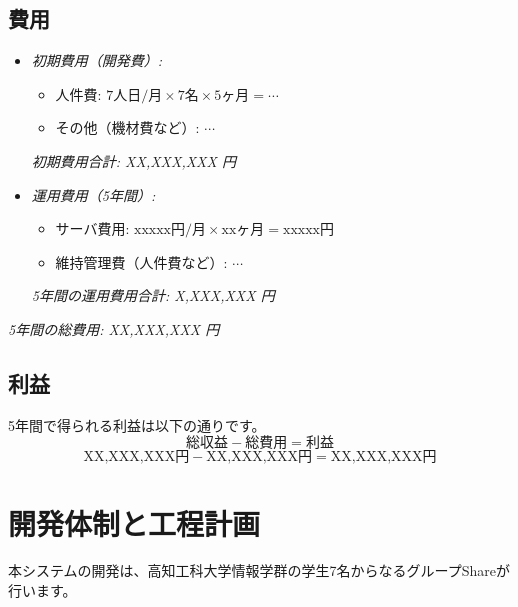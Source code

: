 \documentclass{docs}
\begin{document}
\subsection{費用}
\begin{itemize}
	\item \emph{初期費用（開発費）:}
		\begin{itemize}
			\item 人件費: $\text{7人日/月}\times\text{7名}\times\text{5ヶ月}
			=\cdots$
			\item その他（機材費など）: $\cdots$
		\end{itemize}
		\emph{初期費用合計: XX,XXX,XXX 円}
	\item \emph{運用費用（5年間）:}
		\begin{itemize}
			\item サーバ費用: $\text{xxxxx円/月}\times\text{xxヶ月}
			=\text{xxxxx円}$
			\item 維持管理費（人件費など）: $\cdots$
		\end{itemize}
		\emph{5年間の運用費用合計: X,XXX,XXX 円}
\end{itemize}
\emph{5年間の総費用: XX,XXX,XXX 円}

\subsection{利益}
5年間で得られる利益は以下の通りです。
$$
\text{総収益} - \text{総費用} = \text{利益}
$$
$$
\text{XX,XXX,XXX円} - \text{XX,XXX,XXX円} = \text{XX,XXX,XXX円}
$$

\section{開発体制と工程計画}

本システムの開発は、高知工科大学情報学群の学生7名からなるグループShareが行います。
\end{document}
